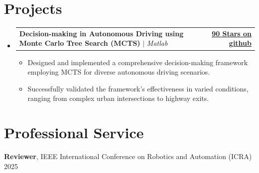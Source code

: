 \documentclass[letterpaper,11pt]{article}
\makeatletter
\newcommand{\resumeItem}[1]{
  \item\small{
    {#1 \vspace{-2pt}}
  }
}
\newcommand{\resumeProjectHeading}[2]{
    \item
    \begin{tabular*}{1.001\textwidth}{l@{\extracolsep{\fill}}r}
      \small#1 & \textbf{\small #2}\\
    \end{tabular*}\vspace{-7pt}
}
\newcommand{\resumeSubHeadingListStart}{\begin{itemize}[leftmargin=0.0in, label={}]}
\newcommand{\resumeSubHeadingListEnd}{\end{itemize}}
\newcommand{\resumeItemListStart}{\begin{itemize}}
\newcommand{\resumeItemListEnd}{\end{itemize}\vspace{-5pt}}
\makeatother
\begin{document}
\section{Projects}
    \vspace{-5pt}
    \resumeSubHeadingListStart
        \resumeProjectHeading
          {\textbf{Decision-making in Autonomous Driving using Monte Carlo Tree Search (MCTS)} $|$ \emph{Matlab}}{\href{https://github.com/zhongshun/MCTS_for_Behavior_Planning}{90 Stars on github}}
          \resumeItemListStart
            \resumeItem{Designed and implemented a comprehensive decision-making framework employing MCTS for diverse autonomous driving scenarios.}
            \resumeItem{Successfully validated the framework's effectiveness in varied conditions, ranging from complex urban intersections to highway exits.}
          \resumeItemListEnd
          
          
    \resumeSubHeadingListEnd
\vspace{-15pt}

\section{Professional Service}
\begin{itemize}[leftmargin=0.15in, label={}]
    \small{
        \item{
            \textbf{Reviewer}, IEEE International Conference on Robotics and Automation (ICRA) 2025
        }
    }
\end{itemize}
\vspace{-16pt}
\end{document}
